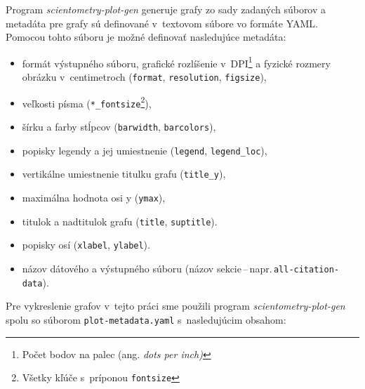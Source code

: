 \noindent Program \emph{scientometry-plot-gen} generuje grafy zo sady zadaných súborov a
metadáta pre grafy sú definované v~textovom súbore vo formáte YAML. Pomocou tohto súboru
je možné definovať nasledujúce metadáta:
\begin{itemize}
  \item formát výstupného súboru, grafické rozlíšenie v~DPI\footnote{Počet bodov na palec (ang. \emph{dots per inch)}} a fyzické rozmery obrázku v~centimetroch (\verb|format|, \verb|resolution|, \verb|figsize|),
  \item veľkosti písma (\verb|*_fontsize|\footnote{Všetky kľúče s~príponou \texttt{fontsize}}),
  \item šírku a farby stĺpcov (\verb|barwidth|, \verb|barcolors|),
  \item popisky legendy a jej umiestnenie  (\verb|legend|, \verb|legend_loc|),
  \item vertikálne umiestnenie titulku grafu (\verb|title_y|),
  \item maximálna hodnota osi y (\verb|ymax|),
  \item titulok a nadtitulok grafu (\verb|title|, \verb|suptitle|).
  \item popisky osí (\verb|xlabel|, \verb|ylabel|).
  \item názov dátového a výstupného súboru (názov sekcie\,--\,napr.\,\verb|all-citation-data|).
\end{itemize}
Pre vykreslenie grafov v~tejto práci sme použili program
\emph{scientometry-plot-gen} spolu so súborom \verb|plot-metadata.yaml|
s~nasledujúcim obsahom:

